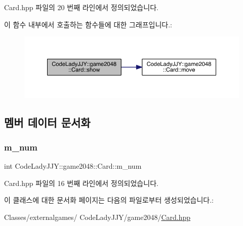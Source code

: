 Card.\+hpp 파일의 20 번째 라인에서 정의되었습니다.

이 함수 내부에서 호출하는 함수들에 대한 그래프입니다.\+:
\nopagebreak
\begin{figure}[H]
\begin{center}
\leavevmode
\includegraphics[width=350pt]{class_code_lady_j_j_y_1_1game2048_1_1_card_abd3f3208867d1450ba4eeef3cef62d3f_cgraph}
\end{center}
\end{figure}


\subsection{멤버 데이터 문서화}
\mbox{\label{class_code_lady_j_j_y_1_1game2048_1_1_card_ae612aaa37e50cb81d6f8ddb7283ebcbc}} 
\subsubsection{\texorpdfstring{m\+\_\+num}{m\_num}}
{\footnotesize\ttfamily int Code\+Lady\+J\+J\+Y\+::game2048\+::\+Card\+::m\+\_\+num}



Card.\+hpp 파일의 16 번째 라인에서 정의되었습니다.



이 클래스에 대한 문서화 페이지는 다음의 파일로부터 생성되었습니다.\+:\begin{DoxyCompactItemize}
\item 
Classes/externalgames/ Code\+Lady\+J\+J\+Y/game2048/\hyperlink{_card_8hpp}{Card.\+hpp}\end{DoxyCompactItemize}
